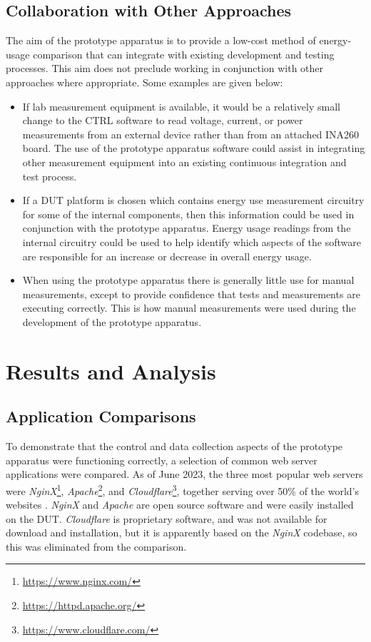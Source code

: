 \subsection{Collaboration with Other Approaches}
\label{collaboration}

The aim of the prototype apparatus is to provide a low-cost method of energy-usage comparison that can integrate with existing development and testing processes. This aim does not preclude working in conjunction with other approaches where appropriate. Some examples are given below:

\begin{itemize}
    \item If lab measurement equipment is available, it would be a relatively small change to the CTRL software to read voltage, current, or power measurements from an external device rather than from an attached INA260 board. The use of the prototype apparatus software could assist in integrating other measurement equipment into an existing \gls{continuous integration} and test process.
    \item If a DUT platform is chosen which contains energy use measurement circuitry for some of the internal components, then this information could be used in conjunction with the prototype apparatus. Energy usage readings from the internal circuitry could be used to help identify which aspects of the software are responsible for an increase or decrease in overall energy usage.
    \item When using the prototype apparatus there is generally little use for manual measurements, except to provide confidence that tests and measurements are executing correctly. This is how manual measurements were used during the development of the prototype apparatus.
\end{itemize}



\section{Results and Analysis}
\label{testrig:results}

\subsection{Application Comparisons}
\label{comparisons}

To demonstrate that the control and data collection aspects of the prototype apparatus were functioning correctly, a selection of common web server applications were compared. As of June 2023, the three most popular web servers were \emph{NginX}\footnote{\url{https://www.nginx.com/}}, \emph{Apache}\footnote{\url{https://httpd.apache.org/}}, and \emph{Cloudflare}\footnote{\url{https://www.cloudflare.com/}}, together serving over 50\% of the world's websites \citep{Netcraft2023}. \emph{NginX} and \emph{Apache} are open source software and were easily installed on the DUT. \emph{Cloudflare} is proprietary software, and was not available for download and installation, but it is apparently based on the \emph{NginX} codebase, so this was eliminated from the comparison.


